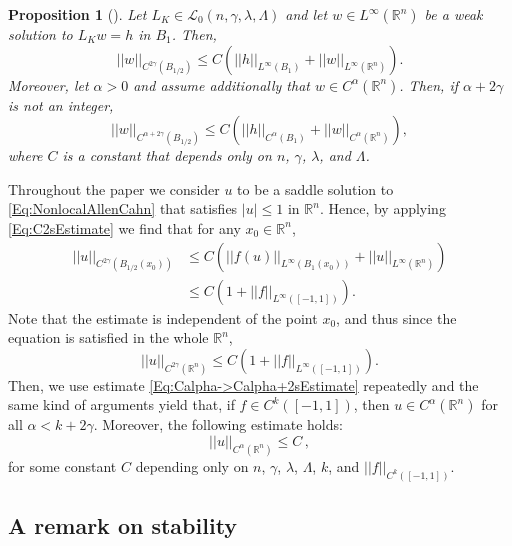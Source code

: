 \documentclass[12pt,reqno]{amsart}
\newtheorem{proposition}[theorem]{Proposition}
\theoremstyle{definition}
\theoremstyle{remark}
\newcommand{\con}[1]{\mathbb{#1}}
\newcommand{\R}{\con{R}} %
\newcommand{\lcal}{\mathcal{L}}
\newcommand{\norm}[1]{\left | \left |{#1} \right | \right |}
\newcommand{\s}{\gamma}
\newcommand{\bpar}[1]{\left ( {#1}\right )}
\numberwithin{equation}{section}
\begin{document}
\begin{proposition}[\cite{RosOton-Survey,SerraC2s+alphaRegularity}]
	\label{Prop:InteriorRegularity}
	Let $L_K \in\lcal_0(n,\s,\lambda, \Lambda)$ and let $w\in L^\infty (\R^n)$ be a weak solution to $L_K w = h$ in $B_1$. Then,
	\begin{equation}
	\label{Eq:C2sEstimate}
	\norm{w}_{C^{2\s} (B_{1/2})} \leq C\bpar{\norm{h}_{L^\infty (B_1)} + \norm{w}_{L^\infty  (\R^n)} }.
	\end{equation}
	Moreover, let $\alpha > 0$ and assume additionally that $w \in C^\alpha (\R^n)$. Then, if $\alpha +
	2\s$ is not an integer,
	\begin{equation}
	\label{Eq:Calpha->Calpha+2sEstimate}
	\norm{w}_{C^{\alpha + 2\s} (B_{1/2})} \leq C\bpar{\norm{h}_{C^{\alpha} (B_1)} + \norm{w}_{C^\alpha (\R^n)} },
	\end{equation}
	where $C$ is a constant that depends only on $n$, $\s$, $\lambda$, and $\Lambda$.
\end{proposition}


Throughout the paper we consider $u$ to be a saddle solution to \eqref{Eq:NonlocalAllenCahn} that satisfies $|u|\leq 1$ in $\R^n$. Hence, by applying \eqref{Eq:C2sEstimate} we find that for any $x_0\in \R^n$,
\begin{align*}
\norm{u}_{C^{2\s} (B_{1/2} (x_0))} &\leq C\bpar{\norm{f(u)}_{L^\infty (B_1(x_0))} + \norm{u}_{L^\infty  (\R^n)} } \\
&\leq C\bpar{1 + \norm{f}_{L^\infty ([-1,1])} }.
\end{align*}
Note that the estimate is independent of the point $x_0$, and thus since the equation is satisfied in the whole $\R^n$,
$$
\norm{u}_{C^{2\s}(\R^n)} \leq C\bpar{1 + \norm{f}_{L^\infty ([-1,1])} }.
$$
Then, we use estimate \eqref{Eq:Calpha->Calpha+2sEstimate} repeatedly and the same kind of arguments yield that, if $f\in C^{k}([-1,1])$, then $u\in C^{\alpha}(\R^n)$ for all $\alpha < k+ 2 \s$. Moreover, the following estimate holds:
$$
\norm{u}_{C^{\alpha}(\R^n)} \leq C\,,
$$
for some constant $C$ depending only on $n$, $\s$, $\lambda$, $\Lambda$, $k$, and $\norm{f}_{C^k([-1,1])}$.



\subsection{A remark on stability}
\label{Subsec:RemarkStability}
\end{document}
